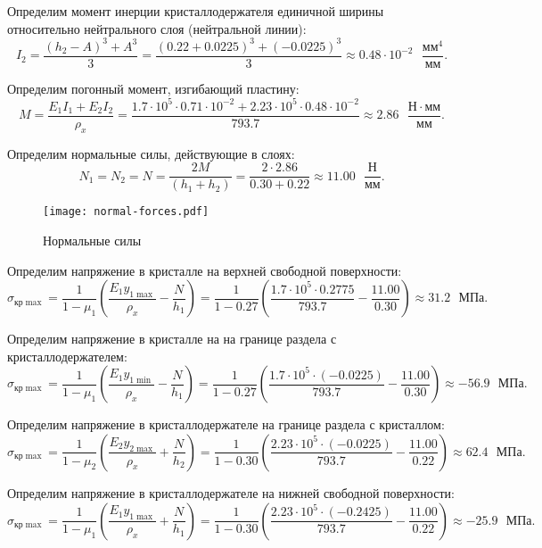 Определим момент инерции кристаллодержателя единичной ширины относительно нейтрального слоя (нейтральной линии):
\[
    I_2 = \frac{(h_2 - A)^3 + A^3}{3}
        = \frac{(0.22 + 0.0225)^3 + (-0.0225)^3}{3}
        \approx 0.48 \cdot 10^{-2} \text{ } \frac{мм^4}{мм}.
\]

Определим погонный момент, изгибающий пластину:
\[
    M = \frac{E_1 I_1 + E_2 I_2}{\rho_x}
      = \frac{1.7 \cdot 10^5 \cdot 0.71 \cdot 10^{-2} + 2.23 \cdot 10^5 \cdot 0.48 \cdot 10^{-2}}{793.7}
      \approx 2.86 \text{ } \frac{Н \cdot мм}{мм}.
\]

Определим нормальные силы, действующие в слоях:
\[
    N_1 = N_2 = N
        = \frac{2M}{(h_1 + h_2)}
        = \frac{2 \cdot 2.86}{0.30 + 0.22}
        \approx 11.00 \text{ } \frac{Н}{мм}.
\]

\begin{figure}[h]
    \centering
    \texttt{[image: normal-forces.pdf]}
    \caption{Нормальные силы}
    \label{fig:normal-forces}
\end{figure}

Определим напряжение в кристалле на верхней свободной поверхности:
\[
    \sigma_{кр \max} = \frac{1}{1 - \mu_1} \left(\frac{E_1 y_{1\max}}{\rho_x} - \frac{N}{h_1}\right)
                     = \frac{1}{1 - 0.27} \left(\frac{1.7 \cdot 10^5 \cdot 0.2775}{793.7} - \frac{11.00}{0.30}\right)
                     \approx 31.2 \text{ } МПа.
\]

Определим напряжение в кристалле на на границе раздела с кристаллодержателем:
\[
    \sigma_{кр \max} = \frac{1}{1 - \mu_1} \left(\frac{E_1 y_{1\min}}{\rho_x} - \frac{N}{h_1}\right)
                     = \frac{1}{1 - 0.27} \left(\frac{1.7 \cdot 10^5 \cdot (-0.0225)}{793.7} - \frac{11.00}{0.30}\right)
                     \approx -56.9\text{ } МПа.
\]

Определим напряжение в кристаллодержателе на границе раздела с кристаллом:
\[
    \sigma_{кр \max} = \frac{1}{1 - \mu_2} \left(\frac{E_2 y_{2\max}}{\rho_x} + \frac{N}{h_2}\right)
                     = \frac{1}{1 - 0.30} \left(\frac{2.23 \cdot 10^5 \cdot (-0.0225)}{793.7} - \frac{11.00}{0.22}\right)
                     \approx 62.4\text{ } МПа.
\]

Определим напряжение в кристаллодержателе на нижней свободной поверхности:
\[
    \sigma_{кр \max} = \frac{1}{1 - \mu_1} \left(\frac{E_1 y_{1\max}}{\rho_x} + \frac{N}{h_1}\right)
                     = \frac{1}{1 - 0.30} \left(\frac{2.23 \cdot 10^5 \cdot (-0.2425)}{793.7} - \frac{11.00}{0.22}\right)
                     \approx -25.9\text{ } МПа.
\]


